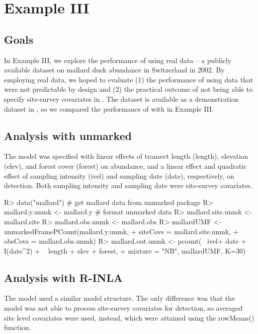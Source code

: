 \documentclass[article]{jss}
\begin{document}
\section[Example III]{Example III}
\subsection[Goals]{Goals}
In Example III, we explore the performance of  using real data -- a publicly available dataset on mallard duck abundance in Switzerland in 2002.  By employing real data, we hoped to evaluate (1) the performance of  using data that were not predictable by design and (2) the practical outcome of not being able to specify site-survey covariates in .  The dataset is available as a demonstration dataset in , so we compared the performance of  with  in Example III.

\subsection[Analysis with unmarked]{Analysis with unmarked}
The  model was specified with linear effects of transect length (length), elevation (elev), and forest cover (forest) on abundance, and a linear effect and quadratic effect of sampling intensity (ivel) and sampling date (date), respectively, on detection.  Both sampling intensity and sampling date were site-survey covariates.

\begin{Code}
R> data("mallard") # get mallard data from unmarked package
R> mallard.y.unmk <- mallard.y # format unmarked data
R> mallard.site.unmk <- mallard.site
R> mallard.obs.unmk <- mallard.obs
R> mallardUMF <- unmarkedFramePCount(mallard.y.unmk, 
+                                    siteCovs = mallard.site.unmk,
+                                    obsCovs = mallard.obs.unmk)
R> mallard.out.unmk <- pcount(~ ivel+ date + I(date^2)
+                             ~ length + elev + forest,
+                             mixture = "NB", mallardUMF, K=30) 
\end{Code}

\subsection[Analysis with R-INLA]{Analysis with R-INLA}
The  model used a similar model structure.  The only difference was that the  model was not able to process site-survey covariates for detection, so averaged site level covariates were used, instead, which were attained using the rowMeans() function.
\end{document}
